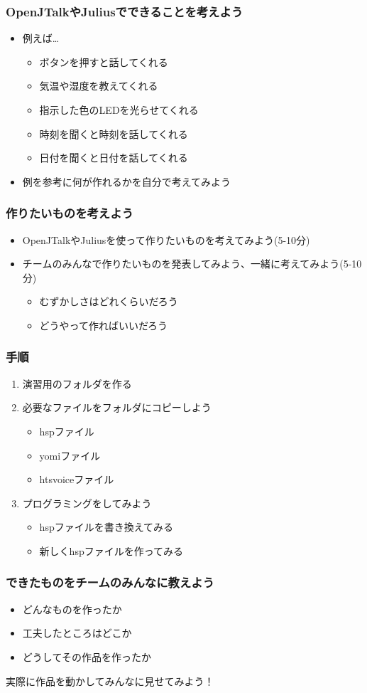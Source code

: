\documentclass[14pt]{beamer}
\begin{document}
\begin{frame}
  \frametitle{OpenJTalkやJuliusでできることを考えよう}
  \begin{itemize}
    \item 例えば…
    \begin{itemize}
      \item ボタンを押すと話してくれる
      \item 気温や湿度を教えてくれる
      \item 指示した色のLEDを光らせてくれる
      \item 時刻を聞くと時刻を話してくれる
      \item 日付を聞くと日付を話してくれる
    \end{itemize}
    \item 例を参考に何が作れるかを自分で考えてみよう
  \end{itemize}
\end{frame}

\begin{frame}
  \frametitle{作りたいものを考えよう}
  \begin{itemize}
    \item OpenJTalkやJuliusを使って作りたいものを考えてみよう(5-10分)
    \item チームのみんなで作りたいものを発表してみよう、一緒に考えてみよう(5-10分)
    \begin{itemize}
      \item むずかしさはどれくらいだろう
      \item どうやって作ればいいだろう
    \end{itemize}
  \end{itemize}
\end{frame}
\begin{frame}
  \frametitle{手順}
  \begin{enumerate}
    \item 演習用のフォルダを作る
    \item 必要なファイルをフォルダにコピーしよう
    \begin{itemize}
      \item hspファイル
      \item yomiファイル
      \item htsvoiceファイル
    \end{itemize}
    \item プログラミングをしてみよう
    \begin{itemize}
      \item hspファイルを書き換えてみる
      \item 新しくhspファイルを作ってみる
    \end{itemize}
  \end{enumerate}
\end{frame}

\begin{frame}
  \frametitle{できたものをチームのみんなに教えよう}
  \begin{itemize}
    \item どんなものを作ったか
    \item 工夫したところはどこか
    \item どうしてその作品を作ったか
  \end{itemize}
  実際に作品を動かしてみんなに見せてみよう！
\end{frame}
\end{document}
